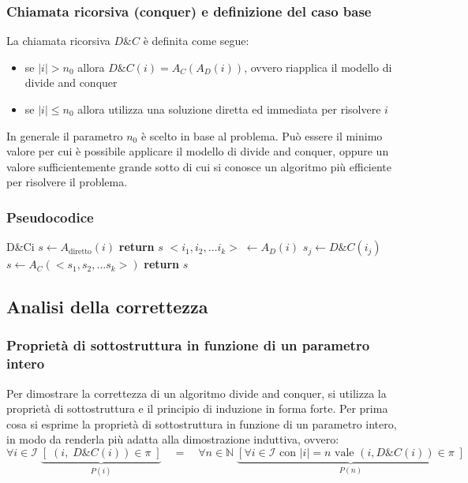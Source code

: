\subsubsection*{Chiamata ricorsiva (conquer) e definizione del caso base}
La chiamata ricorsiva \(D\&C\) è definita come segue:
\begin{itemize}
	\item se \(|i| > n_0\) allora \(D\&C(i) = A_C(A_D(i))\), ovvero riapplica il modello di divide and conquer
	\item se \(|i| \leq n_0\) allora utilizza una soluzione diretta ed immediata per risolvere \(i\)
\end{itemize}
In generale il parametro \(n_0\) è scelto in base al problema. Può essere il minimo valore per cui è possibile applicare
il modello di divide and conquer, oppure un valore sufficientemente grande sotto di cui si conosce un algoritmo più
efficiente per risolvere il problema.

\subsubsection*{Pseudocodice}
\begin{algo}{D\&C}{i}{}{}
 
	\State \(s \gets A_\text{diretto}(i)\) 
	\State \textbf{return} \(s\)
\Else {}
	\State \(<\!i_1, i_2, \dots i_k\!> \; \gets A_D(i)\) 
	 
		\State \(s_j \gets D\&C(i_j)\)
	\EndFor
	\State \(s \gets A_C(<\!s_1, s_2, \dots s_k\!>)\) 
	\State \textbf{return} \(s\)
\EndIf
\end{algo}

\newpage

\subsection{Analisi della correttezza}
\subsubsection*{Proprietà di sottostruttura in funzione di un parametro intero}
Per dimostrare la correttezza di un algoritmo divide and conquer, si utilizza la proprietà di sottostruttura e il principio
di induzione in forma forte. Per prima cosa si esprime la proprietà di sottostruttura in funzione di un parametro intero,
in modo da renderla più adatta alla dimostrazione induttiva, ovvero:
\[\forall i \in \mathcal{I} \; \underbrace{\left[ \; (i, \; D\&C(i)) \in \pi \; \right]}_{P(i)} \quad = \quad \forall n \in \mathbb{N} \; \underbrace{\left[ \forall i \in \mathcal{I} \text{ con } |i| = n  \text{ vale } (i, D\&C(i)) \in \pi \; \right]}_{P(n)}\]

